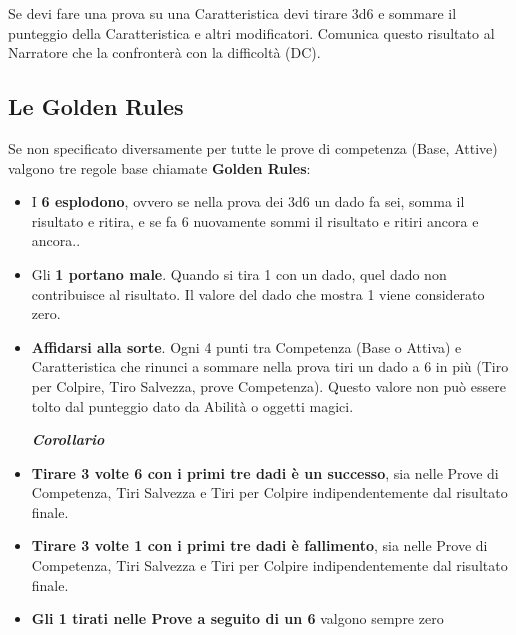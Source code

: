 \begin{multicols}{2}
\medskip

Se devi fare una prova su una Caratteristica devi tirare 3d6 e sommare il punteggio della Caratteristica e altri modificatori. Comunica questo risultato al Narratore che la confronterà con la difficoltà (DC).

\subsection{Le Golden Rules}\label{goldenrules}

Se non specificato diversamente per tutte le prove di competenza (Base, Attive) valgono tre regole base  chiamate \textbf{Golden Rules}:

\begin{itemize}[leftmargin=*] \setlength{\itemsep}{0pt}
\item
I \textbf{6 esplodono}, ovvero se nella prova dei 3d6 un dado fa sei, somma il risultato e ritira, e se fa 6 nuovamente sommi il risultato e ritiri ancora e ancora..
\item
Gli \textbf{1 portano male}. Quando si tira 1 con un dado, quel dado non contribuisce al risultato. Il valore del dado che mostra 1 viene considerato zero.
\item
\textbf{Affidarsi alla sorte}. Ogni 4 punti tra Competenza (Base o Attiva) e Caratteristica che rinunci a sommare nella prova tiri un dado a 6 in più (Tiro per Colpire, Tiro Salvezza, prove Competenza). Questo valore non può essere tolto dal punteggio dato da Abilità o oggetti magici.



\begin{center}\textbf{\emph{Corollario}}\end{center}

\item \textbf{Tirare 3 volte 6 con i primi tre dadi è un successo}, sia nelle Prove di Competenza, Tiri Salvezza e Tiri per Colpire indipendentemente dal risultato finale.

\item \textbf{Tirare 3 volte 1 con i primi tre dadi è fallimento}, sia nelle Prove di Competenza, Tiri Salvezza e Tiri per Colpire indipendentemente dal risultato finale. 

\item\textbf{Gli 1 tirati nelle Prove a seguito di un 6} valgono sempre zero


\end{itemize}
\end{multicols}
